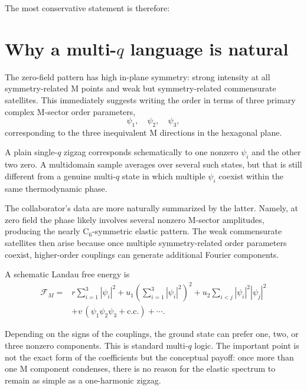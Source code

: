 \documentclass[11pt]{article}
\begin{document}
The most conservative statement is therefore:
\begin{center}
\end{center}

\section{Why a multi-$q$ language is natural}

The zero-field pattern has high in-plane symmetry: strong intensity at all symmetry-related M points and weak but symmetry-related commensurate satellites. This immediately suggests writing the order in terms of three primary complex M-sector order parameters,
\begin{equation}
\psi_1,\quad \psi_2,\quad \psi_3,
\end{equation}
corresponding to the three inequivalent M directions in the hexagonal plane.

A plain single-$q$ zigzag corresponds schematically to one nonzero \(\psi_i\) and the other two zero. A multidomain sample averages over several such states, but that is still different from a genuine multi-$q$ state in which multiple \(\psi_i\) coexist within the same thermodynamic phase.

The collaborator's data are more naturally summarized by the latter. Namely, at zero field the phase likely involves several nonzero M-sector amplitudes, producing the nearly C$_6$-symmetric elastic pattern. The weak commensurate satellites then arise because once multiple symmetry-related order parameters coexist, higher-order couplings can generate additional Fourier components.

A schematic Landau free energy is
\begin{align}
\mathcal{F}_M = {}& r\sum_{i=1}^3 |\psi_i|^2
+ u_1\left(\sum_{i=1}^3 |\psi_i|^2\right)^2
+ u_2\sum_{i<j}|\psi_i|^2|\psi_j|^2 \\
&+ v\, (\psi_1\psi_2\psi_3 + \text{c.c.})
+ \cdots.
\end{align}

Depending on the signs of the couplings, the ground state can prefer one, two, or three nonzero components. This is standard multi-$q$ logic. The important point is not the exact form of the coefficients but the conceptual payoff: once more than one M component condenses, there is no reason for the elastic spectrum to remain as simple as a one-harmonic zigzag.
\end{document}
